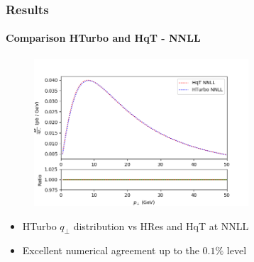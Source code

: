 \documentclass[aspectratio=43]{beamer}
\begin{document}
\begin{frame}

	\frametitle{Results}
	\framesubtitle{Comparison HTurbo and HqT - NNLL}
	
	\begin{figure}
		\includegraphics[width = 8cm]{plots/part_III/hturbo_NNLL_f2only2.png}
	\end{figure}
	
	\begin{itemize}
		\item HTurbo $q_{\perp}$ distribution vs HRes and HqT at NNLL
		\item Excellent numerical agreement up to the $0.1\%$ level
\end{itemize}

\end{frame}
\end{document}
